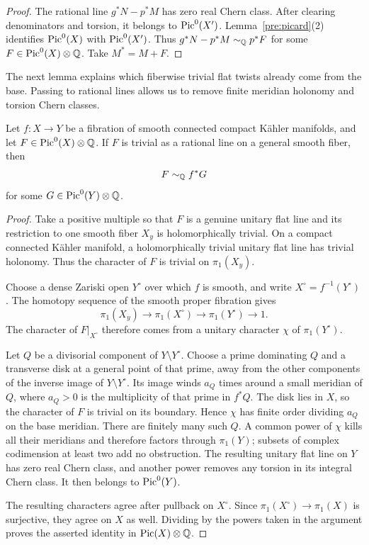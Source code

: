 \begin{proof}
The rational line $g^*N-p^*M$ has zero real Chern class.  After clearing
denominators and torsion, it belongs to $\operatorname{Pic}^0(X')$.
Lemma~\ref{pre:picard}(2) identifies $\operatorname{Pic}^0(X)$ with
$\operatorname{Pic}^0(X')$.  Thus
$g^*N-p^*M\sim_{\mathbb Q} p^*F$ for some $F\in\operatorname{Pic}^0(X)\otimes\mathbb Q$.
Take $M^*=M+F$.
\end{proof}

The next lemma explains which fiberwise trivial flat twists already
come from the base.  Passing to rational lines allows us to remove
finite meridian holonomy and torsion Chern classes.

\begin{lemma}\label{desc:flat}
Let $f:X\to Y$ be a fibration of smooth connected compact K\"ahler
manifolds, and let $F\in\operatorname{Pic}^0(X)\otimes\mathbb Q$.
If $F$ is trivial as a rational line on a general smooth fiber, then
\[
                         F\sim_{\mathbb Q} f^*G
\]
for some $G\in\operatorname{Pic}^0(Y)\otimes\mathbb Q$.
\end{lemma}

\begin{proof}
Take a positive multiple so that $F$ is a genuine unitary flat line
and its restriction to one smooth fiber $X_y$ is holomorphically
trivial.  On a compact connected K\"ahler manifold, a holomorphically
trivial unitary flat line has trivial holonomy.  Thus the character
of $F$ is trivial on $\pi_1(X_y)$.

Choose a dense Zariski open $Y^\circ$ over which $f$ is smooth, and
write $X^\circ=f^{-1}(Y^\circ)$.  The homotopy sequence of the smooth
proper fibration gives
\[
 \pi_1(X_y)\longrightarrow\pi_1(X^\circ)
       \longrightarrow\pi_1(Y^\circ)\longrightarrow1.
\]
The character of $F|_{X^\circ}$ therefore comes from a unitary
character $\chi$ of $\pi_1(Y^\circ)$.

Let $Q$ be a divisorial component of $Y\setminus Y^\circ$.
Choose a prime dominating $Q$ and a transverse disk at a general
point of that prime, away from the other components of the inverse
image of $Y\setminus Y^\circ$.  Its image winds $a_Q$ times around a small meridian
of $Q$, where $a_Q>0$ is the multiplicity of that prime in $f^*Q$.
The disk lies in $X$, so the character of $F$ is trivial on its
boundary.  Hence $\chi$ has finite order dividing $a_Q$ on the base
meridian.  There are finitely many such $Q$.  A common power of
$\chi$ kills all their meridians and therefore factors through
$\pi_1(Y)$; subsets of complex codimension at least two add no
obstruction.  The resulting unitary flat line on $Y$ has zero real
Chern class, and another power removes any torsion in its integral
Chern class.  It then belongs to $\operatorname{Pic}^0(Y)$.

The resulting characters agree after pullback on $X^\circ$.
Since $\pi_1(X^\circ)\to\pi_1(X)$ is surjective, they agree on $X$
as well.  Dividing by the powers taken in the argument proves the
asserted identity in $\operatorname{Pic}(X)\otimes\mathbb Q$.
\end{proof}

